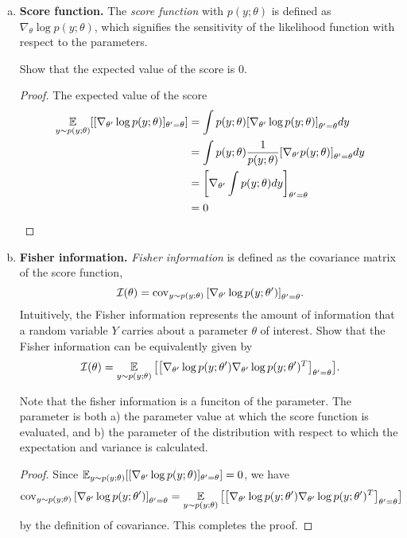 \documentclass[12pt,letterpaper,boxed]{hmcpset}
\begin{document}
\begin{solution}
\begin{enumerate}[(a)]
  \item \textbf{Score function.} The \emph{score function} with $p(y; \theta)$ is defined as $\nabla_\theta \log p(y; \theta)$, which signifies the sensitivity of the likelihood function with respect to the parameters.
  
  Show that the expected value of the score is 0.

  \begin{proof}
    The expected value of the score
    \[
    \begin{aligned}
      \operatorname*{\mathbb{E}}_{y \sim p(y; \theta)}[[\nabla_{\theta'} \log p(y; \theta)]_{\theta' = \theta}] &= \int p(y; \theta) \qty[\nabla_{\theta'} \log p(y; \theta)]_{\theta' = \theta} dy \\
      &= \int p(y; \theta) \frac{1}{p(y; \theta) } \qty[\nabla_{\theta'} p(y; \theta)]_{\theta' = \theta}dy \\
      &= \qty[\nabla_{\theta'} \int p(y; \theta) dy]_{\theta' = \theta}\\
      &= 0
    \end{aligned}
    \]
  \end{proof}

  \item \textbf{Fisher information.} \emph{Fisher information} is defined as the covariance matrix of the score function,
  \[
  \mathcal{I}(\theta) = \operatorname{cov}_{y \sim p(y; \theta)} \qty[\nabla_{\theta'} \log p(y; \theta') ]_{\theta' = \theta}.
  \]
  Intuitively, the Fisher information represents the amount of information that a random variable $Y$ carries about a parameter $\theta$ of interest. Show that the Fisher information can be equivalently given by
  \[
  \mathcal{I}(\theta) = \operatorname*{\mathbb{E}}_{y \sim p(y; \theta)} \qty[ \qty[\nabla_{\theta'} \log p(y; \theta') \nabla_{\theta'} \log p(y; \theta')^T ]_{\theta' = \theta}].
  \]

  Note that the fisher information is a funciton of the parameter. The parameter is both a) the parameter value at which the score function is evaluated, and b) the parameter of the distribution with respect to which the expectation and variance is calculated.

  \begin{proof}
    Since $\operatorname*{\mathbb{E}}_{y \sim p(y; \theta)}[[\nabla_{\theta'} \log p(y; \theta)]_{\theta' = \theta}] = 0$, we have
    \[
      \operatorname{cov}_{y \sim p(y; \theta)} \qty[\nabla_{\theta'} \log p(y; \theta') ]_{\theta' = \theta} = \operatorname*{\mathbb{E}}_{y \sim p(y; \theta)} \qty[ \qty[\nabla_{\theta'} \log p(y; \theta') \nabla_{\theta'} \log p(y; \theta')^T ]_{\theta' = \theta}]
    \]
    by the definition of covariance. This completes the proof.
  \end{proof}


\end{enumerate}
\end{solution}
\end{document}
